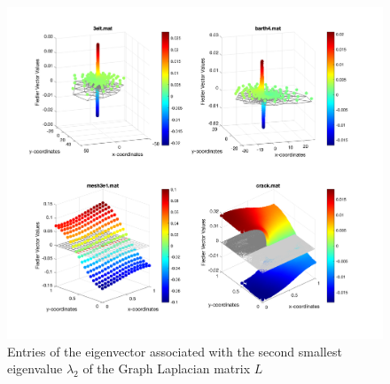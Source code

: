 \begin{figure}[H]
	\centering
	\includegraphics[width=\textwidth]{./media/fiedler.png}
	\caption{Entries of the eigenvector associated with the second smallest eigenvalue $\lambda_2$ of the Graph Laplacian matrix $L$}
	\label{fig:fied}
\end{figure}

